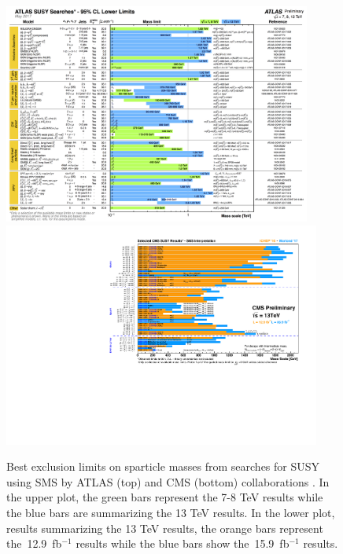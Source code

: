 \begin{figure}[!hb]
\centering
  \includegraphics[width=0.9\textwidth]{Plots/SUSY/ATLAS_SUSY_Summary}
  \includegraphics[width=0.93\textwidth]{Plots/SUSY/CMS_Moriond2017_BarPlot}
  \caption{ Best exclusion limits on sparticle masses from searches for SUSY using SMS by ATLAS (top) and CMS (bottom) collaborations \cite{atlasSUSYsummary,cmsSUSYsummary}. In the upper plot, the green bars represent the 7-8 TeV results while the blue bars are summarizing the 13 TeV results. In the lower plot, results summarizing the 13 TeV results, the orange bars represent the~12.9~fb$^{-1}$ results while the blue bars show the~15.9~fb$^{-1}$ results.
  }
  \label{fig:susy_Summary}
\end{figure}

